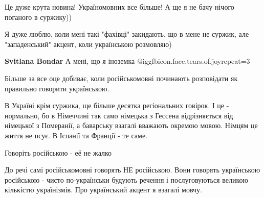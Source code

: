 Це дуже крута новина! Україномовних все більше! А ще я не бачу нічого поганого
в суржику))


 

Я дуже люблю, коли мені такі "фахівці" закидають, що в мене не суржик, але
"западенський" акцент, коли українською розмовляю)

\begin{itemize} %
 
\textbf{Svitlana Bondar} А мені, що я іноземка  @igg{fbicon.face.tears.of.joy}{repeat=3} 
\end{itemize} %

 

Більше за все оце добиває, коли російськомовні починають розповідати як
правильно говорити українською.

В Україні крім суржика, ще більше десятка регіональних говірок. І це -
нормально, бо в Німеччині так само німецька з Гессена відрізняється від
німецької з Померанії, а баварську взагалі вважають окремою мовою. Німцям це
життя не псує. В Іспанії та Франції - те саме.


 
Говоріть російською - её не жалко

 

До речі самі російськомовні говорять НЕ російською. Вони говорять українською
російською - чисто по-українськи будують речення і послуговуються великою
кількістю українізмів. Про український акцент я взагалі мовчу.

